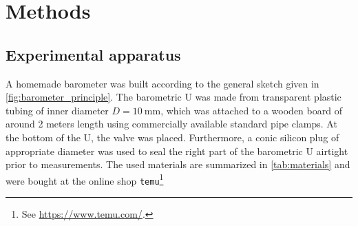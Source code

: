 \documentclass[a4paper,11pt, twocolumn]{article}
\begin{document}
\section{Methods}
\subsection{Experimental apparatus}
A homemade barometer was built according to the general sketch given in \cref{fig:barometer_principle}. The barometric U was made from transparent plastic tubing of inner diameter $D = \SI{10}{\milli\meter}$, which was attached to a wooden board of around 2 meters length using commercially available standard pipe clamps. At the bottom of the U, the valve was placed. Furthermore, a conic silicon plug of appropriate diameter was used to seal the right part of the barometric U airtight prior to measurements. The used materials are summarized in \cref{tab:materials} and were bought at the online shop \verb|temu|\footnote{See \url{https://www.temu.com/}.}
\end{document}
